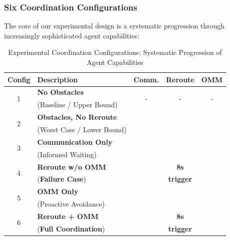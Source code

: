 \documentclass[conference]{IEEEtran}
\newcommand{\cmark}{\ding{51}}%
\newcommand{\xmark}{\ding{55}}%
\begin{document}
\subsubsection{Six Coordination Configurations}

The core of our experimental design is a systematic progression through increasingly sophisticated agent capabilities:

\begin{table}[H]
\centering
\caption{Experimental Coordination Configurations: Systematic Progression of Agent Capabilities}
\label{tab:exp_configs}
\begin{tabular}{|c|l|c|c|c|}
\hline
\textbf{Config} & \textbf{Description} & \textbf{Comm.} & \textbf{Reroute} & \textbf{OMM} \\
\hline
\multirow{2}{*}{1} & \textbf{No Obstacles} & \multirow{2}{*}{-} & \multirow{2}{*}{-} & \multirow{2}{*}{-} \\
 & (Baseline / Upper Bound) & & & \\
\hline
\multirow{2}{*}{2} & \textbf{Obstacles, No Reroute} & \multirow{2}{*}{\xmark} & \multirow{2}{*}{\xmark} & \multirow{2}{*}{\xmark} \\
 & (Worst Case / Lower Bound) & & & \\
\hline
\multirow{2}{*}{3} & \textbf{Communication Only} & \multirow{2}{*}{\cmark} & \multirow{2}{*}{\xmark} & \multirow{2}{*}{\xmark} \\
 & (Informed Waiting) & & & \\
\hline
\multirow{2}{*}{4} & \textbf{Reroute w/o OMM} & \multirow{2}{*}{\cmark} & \textbf{8s} & \multirow{2}{*}{\xmark} \\
 & (\textbf{Failure Case}) & & \textbf{trigger} & \\
\hline
\multirow{2}{*}{5} & \textbf{OMM Only} & \multirow{2}{*}{\cmark} & \multirow{2}{*}{\xmark} & \multirow{2}{*}{\cmark} \\
 & (Proactive Avoidance) & & & \\
\hline
\multirow{2}{*}{6} & \textbf{Reroute + OMM} & \multirow{2}{*}{\cmark} & \textbf{8s} & \multirow{2}{*}{\cmark} \\
 & (\textbf{Full Coordination}) & & \textbf{trigger} & \\
\hline
\end{tabular}
\end{table}
\end{document}
